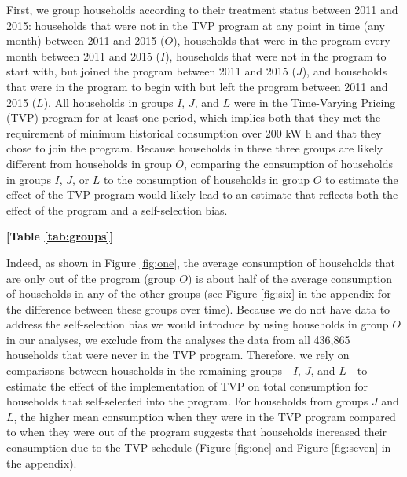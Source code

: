 \documentclass[12pt]{article}
\begin{document}
First, we group households according to their treatment status between 2011 and 2015: households that were not in the TVP program at any point in time (any month) between 2011 and 2015 ($O$), households that were in the program every month between 2011 and 2015 ($I$), households that were not in the program to start with, but joined the program between 2011 and 2015 ($J$), and households that were in the program to begin with but left the program between 2011 and 2015 ($L$). All households in groups $I$, $J$, and $L$ were in the Time-Varying Pricing (TVP) program for at least one period, which implies both that they met the requirement of minimum historical consumption over 200 kW h and that they chose to join the program. Because households in these three groups are likely different from households in group $O$, comparing the consumption of households in groups $I$, $J$, or $L$ to the consumption of households in group $O$ to estimate the effect of the TVP program would likely lead to an estimate that reflects both the effect of the program and a self-selection bias.

\centerline{\textbf{[Table \ref{tab:groups}]}}


Indeed, as shown in Figure \ref{fig:one}, the average consumption of households that are only out of the program (group $O$) is about half of the average consumption of households in any of the other groups (see Figure \ref{fig:six} in the appendix for the difference between these groups over time). Because we do not have data to address the self-selection bias we would introduce by using households in group $O$ in our analyses, we exclude from the analyses the data from all 436,865 households that were never in the TVP program. Therefore, we rely on comparisons between households in the remaining groups---$I$, $J$, and  $L$---to estimate the effect of the implementation of TVP on total consumption for households that self-selected into the program. For households from groups $J$ and $L$, the higher mean consumption when they were in the TVP program compared to when they were out of the program suggests that households increased their consumption due to the TVP schedule (Figure \ref{fig:one} and Figure \ref{fig:seven} in the appendix).
\end{document}
